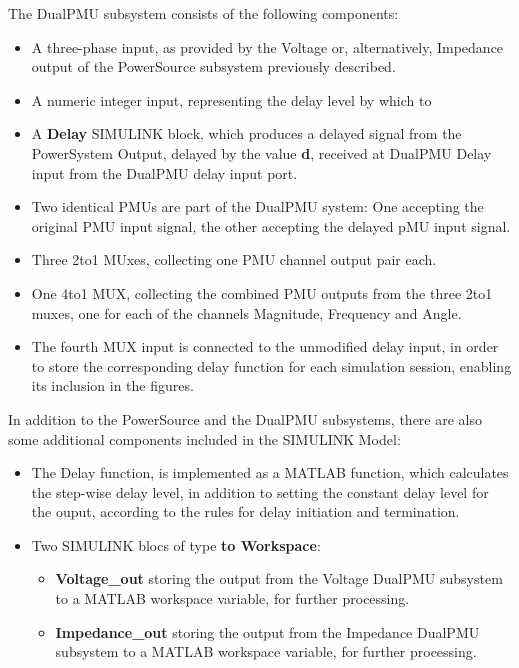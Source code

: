 The DualPMU subsystem consists of the following components:
\begin{itemize}
    \item A three-phase input, as provided by the Voltage or, alternatively, Impedance output of the PowerSource subsystem previously described.
    \item A numeric integer input, representing the delay level by which to 
    \item A \textbf{Delay} SIMULINK block, which produces a delayed signal from the PowerSystem Output, delayed by the value \textbf{d}, received at DualPMU Delay input from the DualPMU delay input port.
    \item Two identical PMUs are part of the DualPMU system: One accepting the original PMU input signal, the other accepting the delayed pMU input signal.
    \item Three 2to1 MUxes, collecting one PMU channel output pair each.
    \item One 4to1  MUX, collecting the combined PMU outputs from the three 2to1 muxes, one for each of the channels Magnitude, Frequency and Angle. 
    \item The fourth MUX input is connected to the unmodified delay input, in order to store the corresponding delay function for each simulation session, enabling its inclusion in the figures.
\end{itemize}

In addition to the PowerSource and the DualPMU subsystems, there are also some additional components included in the SIMULINK Model:
\begin{itemize}
    \item The Delay function, is implemented as a MATLAB function, which calculates the step-wise delay level, in addition to setting the constant delay level for the ouput, according to the rules for delay initiation and termination.
    \item Two SIMULINK blocs of type \textbf{to Workspace}:
    \begin{itemize}
        \item \textbf{Voltage\_out} storing the output from the Voltage DualPMU subsystem to a MATLAB workspace variable, for further processing.
        \item \textbf{Impedance\_out} storing the output from the Impedance DualPMU subsystem to a MATLAB workspace variable, for further processing.
    \end{itemize}

\end{itemize}

